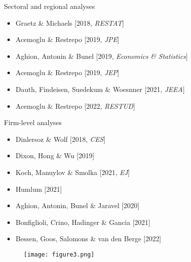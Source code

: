 \documentclass[notes=show]{beamer}
\begin{document}
\begin{frame}{Sectoral and regional analyses}
\begin{itemize}
\item Graetz \& Michaels [2018, \textit{RESTAT}] \medskip
\item Acemoglu \& Restrepo [2019, \textit{JPE}] \medskip
\item Aghion, Antonin \& Bunel [2019, \textit{Economics \& Statistics}] \medskip
\item Acemoglu \& Restrepo [2019, \textit{JEP}] \medskip
\item Dauth, Findeisen, Suedekum \& Woesnner [2021, \textit{JEEA}] \medskip
\item Acemoglu \& Restrepo [2022, \textit{RESTUD}]
\end{itemize}
\end{frame}

\begin{frame}{Firm-level analyses}
\begin{itemize}
\item Dinlersoz \& Wolf [2018, \textit{CES}] \smallskip
\item Dixon, Hong \& Wu [2019] \smallskip
\item Koch, Manuylov \& Smolka [2021, \textit{EJ}] \smallskip
\item Humlum [2021] \smallskip
\item Aghion, Antonin, Bunel \& Jaravel [2020] \smallskip
\item Bonfiglioli, Crino, Hadinger \& Gancia [2021] \smallskip
\item Bessen, Goos, Salomons \& van den Berge [2022] \smallskip

\end{itemize}
\end{frame}

\newpage
\begin{center}
\vspace*{0.1cm}
\begin{figure}
\texttt{[image: figure3.png]}
\end{figure} 
\end{center}
\newpage
\end{document}
